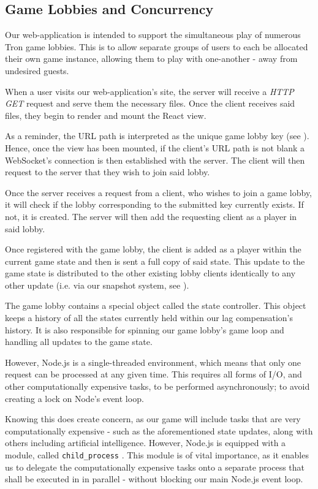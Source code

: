 \documentclass{standalone}
\begin{document}
		\subsection{Game Lobbies and Concurrency} \label{sec:lobbyConcurrency}
			Our web-application is intended to support the simultaneous play of numerous Tron game lobbies. This is to allow separate groups of users to each be allocated their own game instance, allowing them to play with one-another - away from undesired guests.

			When a user visits our web-application's site, the server will receive a \emph{HTTP GET} request and serve them the necessary files. Once the client receives said files, they begin to render and mount the React view.

			As a reminder, the URL path is interpreted as the unique game lobby key (see ). Hence, once the view has been mounted, if the client's URL path is not blank a WebSocket's connection is then established with the server. The client will then request to the server that they wish to join said lobby.

			Once the server receives a request from a client, who wishes to join a game lobby, it will check if the lobby corresponding to the submitted key currently exists. If not, it is created. The server will then add the requesting client as a player in said lobby.

			Once registered with the game lobby, the client is added as a player within the current game state and then is sent a full copy of said state. This update to the game state is distributed to the other existing lobby clients identically to any other update (i.e. via our snapshot system, see ).

			The game lobby contains a special object called the state controller. This object keeps a history of all the states currently held within our lag compensation's history. It is also responsible for spinning our game lobby's game loop and handling all updates to the game state.

			However, Node.js is a single-threaded environment, which means that only one request can be processed at any given time. This requires all forms of I/O, and other computationally expensive tasks, to be performed asynchronously; to avoid creating a lock on Node's event loop.

			Knowing this does create concern, as our game will include tasks that are very computationally expensive - such as the aforementioned state updates, along with others including artificial intelligence. However, Node.js is equipped with a module, called \texttt{child\_process} \parencite{nodeChildProcess}. This module is of vital importance, as it enables us to delegate the computationally expensive tasks onto a separate process that shall be executed in in parallel - without blocking our main Node.js event loop.
\end{document}
